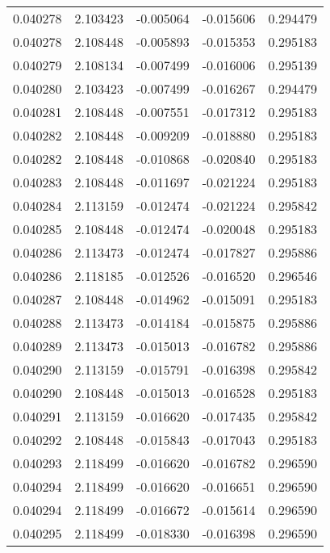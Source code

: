 \begin{tabular}{lrrrr}
0.040278    &  2.103423 & -0.005064 & -0.015606 &             0.294479 \\
0.040278    &  2.108448 & -0.005893 & -0.015353 &             0.295183 \\
0.040279    &  2.108134 & -0.007499 & -0.016006 &             0.295139 \\
0.040280    &  2.103423 & -0.007499 & -0.016267 &             0.294479 \\
0.040281    &  2.108448 & -0.007551 & -0.017312 &             0.295183 \\
0.040282    &  2.108448 & -0.009209 & -0.018880 &             0.295183 \\
0.040282    &  2.108448 & -0.010868 & -0.020840 &             0.295183 \\
0.040283    &  2.108448 & -0.011697 & -0.021224 &             0.295183 \\
0.040284    &  2.113159 & -0.012474 & -0.021224 &             0.295842 \\
0.040285    &  2.108448 & -0.012474 & -0.020048 &             0.295183 \\
0.040286    &  2.113473 & -0.012474 & -0.017827 &             0.295886 \\
0.040286    &  2.118185 & -0.012526 & -0.016520 &             0.296546 \\
0.040287    &  2.108448 & -0.014962 & -0.015091 &             0.295183 \\
0.040288    &  2.113473 & -0.014184 & -0.015875 &             0.295886 \\
0.040289    &  2.113473 & -0.015013 & -0.016782 &             0.295886 \\
0.040290    &  2.113159 & -0.015791 & -0.016398 &             0.295842 \\
0.040290    &  2.108448 & -0.015013 & -0.016528 &             0.295183 \\
0.040291    &  2.113159 & -0.016620 & -0.017435 &             0.295842 \\
0.040292    &  2.108448 & -0.015843 & -0.017043 &             0.295183 \\
0.040293    &  2.118499 & -0.016620 & -0.016782 &             0.296590 \\
0.040294    &  2.118499 & -0.016620 & -0.016651 &             0.296590 \\
0.040294    &  2.118499 & -0.016672 & -0.015614 &             0.296590 \\
0.040295    &  2.118499 & -0.018330 & -0.016398 &             0.296590 \\

\end{tabular}

